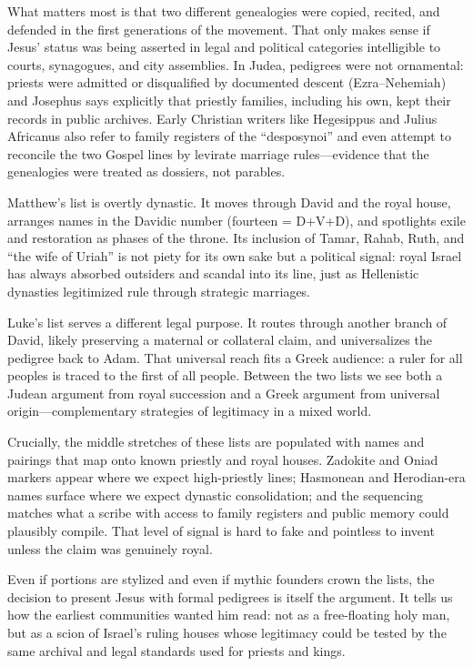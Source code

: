 What matters most is that two different genealogies were copied, recited, and defended in the first generations of the movement.
That only makes sense if Jesus’ status was being asserted in legal and political categories intelligible to courts, synagogues, and city assemblies.
In Judea, pedigrees were not ornamental: priests were admitted or disqualified by documented descent (Ezra–Nehemiah) and Josephus says explicitly that priestly families, including his own, kept their records in public archives.
Early Christian writers like Hegesippus and Julius Africanus also refer to family registers of the “desposynoi” and even attempt to reconcile the two Gospel lines by levirate marriage rules—evidence that the genealogies were treated as dossiers, not parables.

Matthew’s list is overtly dynastic.
It moves through David and the royal house, arranges names in the Davidic number (fourteen = D+V+D), and spotlights exile and restoration as phases of the throne.
Its inclusion of Tamar, Rahab, Ruth, and “the wife of Uriah” is not piety for its own sake but a political signal: royal Israel has always absorbed outsiders and scandal into its line, just as Hellenistic dynasties legitimized rule through strategic marriages.

Luke’s list serves a different legal purpose.
It routes through another branch of David, likely preserving a maternal or collateral claim, and universalizes the pedigree back to Adam.
That universal reach fits a Greek audience: a ruler for all peoples is traced to the first of all people.
Between the two lists we see both a Judean argument from royal succession and a Greek argument from universal origin—complementary strategies of legitimacy in a mixed world.

Crucially, the middle stretches of these lists are populated with names and pairings that map onto known priestly and royal houses.
Zadokite and Oniad markers appear where we expect high-priestly lines; Hasmonean and Herodian-era names surface where we expect dynastic consolidation; and the sequencing matches what a scribe with access to family registers and public memory could plausibly compile.
That level of signal is hard to fake and pointless to invent unless the claim was genuinely royal.

Even if portions are stylized and even if mythic founders crown the lists, the decision to present Jesus with formal pedigrees is itself the argument.
It tells us how the earliest communities wanted him read: not as a free-floating holy man, but as a scion of Israel’s ruling houses whose legitimacy could be tested by the same archival and legal standards used for priests and kings.

